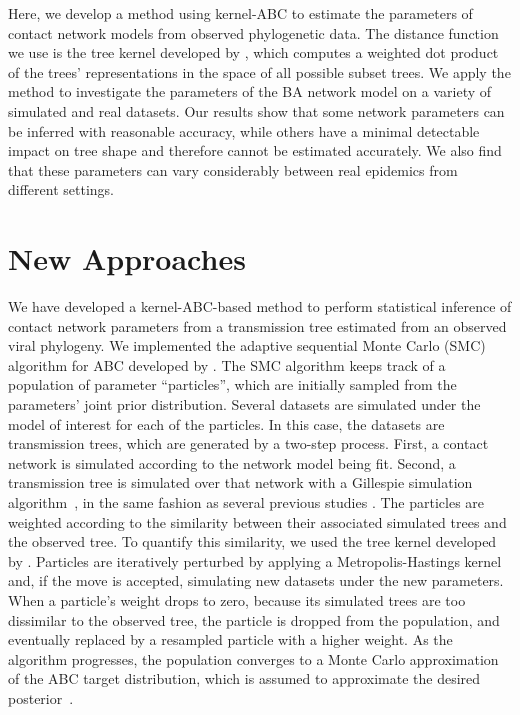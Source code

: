 \documentclass[nogrid]{MBE}
\begin{document}
Here, we develop a method using kernel-ABC to estimate the parameters of
contact network models from observed phylogenetic data. The distance function
we use is the tree kernel developed by \citet{poon2013mapping}, which computes
a weighted dot product of the trees' representations in the space of all
possible subset trees. We apply the method to investigate the parameters of the
BA network model on a variety of simulated and real datasets. Our results show
that some network parameters can be inferred with reasonable accuracy, while
others have a minimal detectable impact on tree shape and therefore cannot be
estimated accurately. We also find that these parameters can vary considerably
between real epidemics from different settings.

\section{New Approaches}

We have developed a kernel-ABC-based method to perform statistical inference of
contact network parameters from a transmission tree estimated from an observed
viral phylogeny. We implemented the adaptive sequential Monte Carlo (SMC)
algorithm for ABC developed by \citet{del2012adaptive}. The SMC algorithm keeps
track of a population of parameter ``particles'', which are initially sampled
from the parameters' joint prior distribution. Several datasets are simulated
under the model of interest for each of the particles. In this case, the
datasets are transmission trees, which are generated by a two-step process.
First, a contact network is simulated according to the network model being fit.
Second, a transmission tree is simulated over that network with a Gillespie
simulation algorithm~\citep{gillespie1976general}, in the same fashion as
several previous studies \citep[\textit{e.g.}][]{robinson2013dynamics,
leventhal2012inferring}. The particles are weighted according to the similarity
between their associated simulated trees and the observed tree. To quantify
this similarity, we used the tree kernel developed by \citet{poon2013mapping}.
Particles are iteratively perturbed by applying a Metropolis-Hastings kernel
and, if the move is accepted, simulating new datasets under the new parameters.
When a particle's weight drops to zero, because its simulated trees are too
dissimilar to the observed tree, the particle is dropped from the population,
and eventually replaced by a resampled particle with a higher weight. As the
algorithm progresses, the population converges to a Monte Carlo approximation
of the ABC target distribution, which is assumed to approximate the desired
posterior~\citep{del2012adaptive, sunnaaker2013approximate}.
\end{document}
